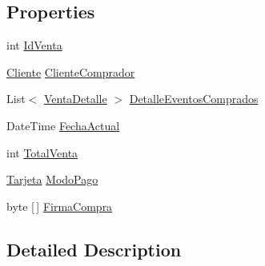 \subsection*{Properties}
\begin{DoxyCompactItemize}
\item 
int \hyperlink{classprj_progra_i_i_i_1_1_layer_1_1_entities_1_1_venta_cabecera_aa824c5bc8ec364abf408a8dd33021555}{Id\+Venta}
\item 
\hyperlink{classprj_progra_i_i_i_1_1_layer_1_1_entities_1_1_cliente}{Cliente} \hyperlink{classprj_progra_i_i_i_1_1_layer_1_1_entities_1_1_venta_cabecera_a0ff8602ca349f48214db9d53515fb188}{Cliente\+Comprador}
\item 
List$<$ \hyperlink{classprj_progra_i_i_i_1_1_layer_1_1_entities_1_1_venta_detalle}{Venta\+Detalle} $>$ \hyperlink{classprj_progra_i_i_i_1_1_layer_1_1_entities_1_1_venta_cabecera_a49d8f974c5cbca56650bcf6da64e46a6}{Detalle\+Eventos\+Comprados}
\item 
Date\+Time \hyperlink{classprj_progra_i_i_i_1_1_layer_1_1_entities_1_1_venta_cabecera_aa4e5cca75fbbebb22d11ad26564d9a9b}{Fecha\+Actual}
\item 
int \hyperlink{classprj_progra_i_i_i_1_1_layer_1_1_entities_1_1_venta_cabecera_a3f92bd1e1a8d703eaf1e4fde0d9c9ec5}{Total\+Venta}
\item 
\hyperlink{classprj_progra_i_i_i_1_1_layer_1_1_entities_1_1_tarjeta}{Tarjeta} \hyperlink{classprj_progra_i_i_i_1_1_layer_1_1_entities_1_1_venta_cabecera_a0fdbc154d107d59d9308c145afe87123}{Modo\+Pago}
\item 
byte \mbox{[}$\,$\mbox{]} \hyperlink{classprj_progra_i_i_i_1_1_layer_1_1_entities_1_1_venta_cabecera_a801fec3bd5e888c4a1b23c25b66edfc6}{Firma\+Compra}
\end{DoxyCompactItemize}


\subsection{Detailed Description}


